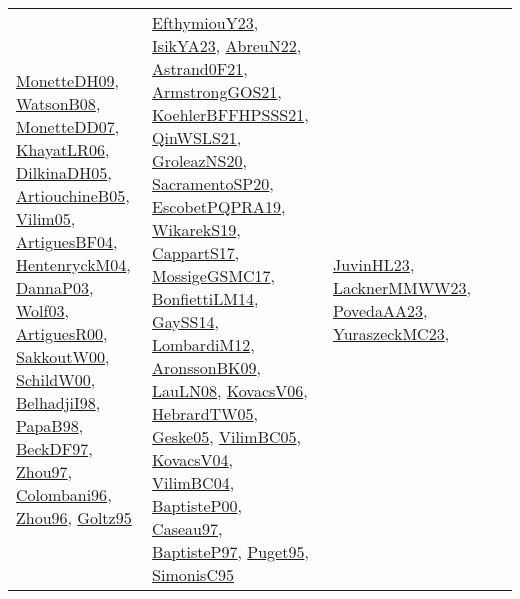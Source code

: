 {\begin{longtable}{lp{3cm}>{\raggedright}p{6cm}>{\raggedright}p{6cm}p{8cm}}
\href{papers/MonetteDH09.pdf}{MonetteDH09}\cite{MonetteDH09}, \href{papers/WatsonB08.pdf}{WatsonB08}\cite{WatsonB08}, \href{papers/MonetteDD07.pdf}{MonetteDD07}\cite{MonetteDD07}, \href{articles/KhayatLR06.pdf}{KhayatLR06}\cite{KhayatLR06}, \href{papers/DilkinaDH05.pdf}{DilkinaDH05}\cite{DilkinaDH05}, \href{papers/ArtiouchineB05.pdf}{ArtiouchineB05}\cite{ArtiouchineB05}, \href{papers/Vilim05.pdf}{Vilim05}\cite{Vilim05}, \href{papers/ArtiguesBF04.pdf}{ArtiguesBF04}\cite{ArtiguesBF04}, \href{papers/HentenryckM04.pdf}{HentenryckM04}\cite{HentenryckM04}, \href{papers/DannaP03.pdf}{DannaP03}\cite{DannaP03}, \href{papers/Wolf03.pdf}{Wolf03}\cite{Wolf03}, \href{articles/ArtiguesR00.pdf}{ArtiguesR00}\cite{ArtiguesR00}, \href{articles/SakkoutW00.pdf}{SakkoutW00}\cite{SakkoutW00}, \href{articles/SchildW00.pdf}{SchildW00}\cite{SchildW00}, \href{articles/BelhadjiI98.pdf}{BelhadjiI98}\cite{BelhadjiI98}, \href{articles/PapaB98.pdf}{PapaB98}\cite{PapaB98}, \href{papers/BeckDF97.pdf}{BeckDF97}\cite{BeckDF97}, \href{articles/Zhou97.pdf}{Zhou97}\cite{Zhou97}, \href{papers/Colombani96.pdf}{Colombani96}\cite{Colombani96}, \href{papers/Zhou96.pdf}{Zhou96}\cite{Zhou96}, \href{papers/Goltz95.pdf}{Goltz95}\cite{Goltz95} & \href{papers/EfthymiouY23.pdf}{EfthymiouY23}\cite{EfthymiouY23}, \href{articles/IsikYA23.pdf}{IsikYA23}\cite{IsikYA23}, \href{articles/AbreuN22.pdf}{AbreuN22}\cite{AbreuN22}, \href{papers/Astrand0F21.pdf}{Astrand0F21}\cite{Astrand0F21}, \href{papers/ArmstrongGOS21.pdf}{ArmstrongGOS21}\cite{ArmstrongGOS21}, \href{articles/KoehlerBFFHPSSS21.pdf}{KoehlerBFFHPSSS21}\cite{KoehlerBFFHPSSS21}, \href{articles/QinWSLS21.pdf}{QinWSLS21}\cite{QinWSLS21}, \href{papers/GroleazNS20.pdf}{GroleazNS20}\cite{GroleazNS20}, \href{articles/SacramentoSP20.pdf}{SacramentoSP20}\cite{SacramentoSP20}, \href{articles/EscobetPQPRA19.pdf}{EscobetPQPRA19}\cite{EscobetPQPRA19}, \href{articles/WikarekS19.pdf}{WikarekS19}\cite{WikarekS19}, \href{papers/CappartS17.pdf}{CappartS17}\cite{CappartS17}, \href{papers/MossigeGSMC17.pdf}{MossigeGSMC17}\cite{MossigeGSMC17}, \href{papers/BonfiettiLM14.pdf}{BonfiettiLM14}\cite{BonfiettiLM14}, \href{papers/GaySS14.pdf}{GaySS14}\cite{GaySS14}, \href{articles/LombardiM12.pdf}{LombardiM12}\cite{LombardiM12}, \href{papers/AronssonBK09.pdf}{AronssonBK09}\cite{AronssonBK09}, \href{papers/LauLN08.pdf}{LauLN08}\cite{LauLN08}, \href{papers/KovacsV06.pdf}{KovacsV06}\cite{KovacsV06}, \href{papers/HebrardTW05.pdf}{HebrardTW05}\cite{HebrardTW05}, \href{papers/Geske05.pdf}{Geske05}\cite{Geske05}, \href{articles/VilimBC05.pdf}{VilimBC05}\cite{VilimBC05}, \href{papers/KovacsV04.pdf}{KovacsV04}\cite{KovacsV04}, \href{papers/VilimBC04.pdf}{VilimBC04}\cite{VilimBC04}, \href{articles/BaptisteP00.pdf}{BaptisteP00}\cite{BaptisteP00}, \href{papers/Caseau97.pdf}{Caseau97}\cite{Caseau97}, \href{papers/BaptisteP97.pdf}{BaptisteP97}\cite{BaptisteP97}, \href{papers/Puget95.pdf}{Puget95}\cite{Puget95}, \href{papers/SimonisC95.pdf}{SimonisC95}\cite{SimonisC95} & \href{papers/JuvinHL23.pdf}{JuvinHL23}\cite{JuvinHL23}, \href{articles/LacknerMMWW23.pdf}{LacknerMMWW23}\cite{LacknerMMWW23}, \href{papers/PovedaAA23.pdf}{PovedaAA23}\cite{PovedaAA23}, \href{papers/YuraszeckMC23.pdf}{YuraszeckMC23}\cite{YuraszeckMC23}, 
\end{longtable}}
